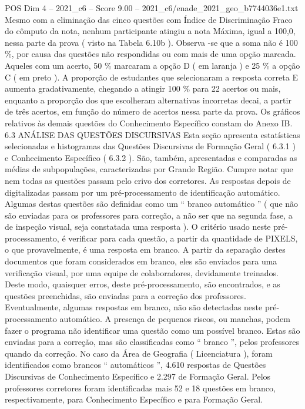 \begin{textsample}{POS Dim 4 – 2021\_c6 – Score 9.00 – 2021\_c6/enade\_2021\_geo\_b7744036e1.txt}
Mesmo com a eliminação das cinco questões com Índice de Discriminação Fraco do cômputo da nota, nenhum participante atingiu a nota Máxima, igual a 100,0, nessa parte da prova ( visto na Tabela 6.10b ).
Observa -se que a soma não é 100 \%, por causa das questões não respondidas ou com mais de uma opção marcada.
Aqueles com um acerto, 50 \% marcaram a opção D ( em laranja ) e 25 \% a opção C ( em preto ).
A proporção de estudantes que selecionaram a resposta correta E aumenta gradativamente, chegando a atingir 100 \% para 22 acertos ou mais, enquanto a proporção dos que escolheram alternativas incorretas decai, a partir de três acertos, em função do número de acertos nessa parte da prova.
Os gráficos relativos às demais questões do Conhecimento Específico constam do Anexo IB. 6.3 ANÁLISE DAS QUESTÕES DISCURSIVAS Esta seção apresenta estatísticas selecionadas e histogramas das Questões Discursivas de Formação Geral ( 6.3.1 ) e Conhecimento Específico ( 6.3.2 ).
São, também, apresentadas e comparadas as médias de subpopulações, caracterizadas por Grande Região.
Cumpre notar que nem todas as questões passam pelo crivo dos corretores.
As respostas depois de digitalizadas passam por um pré-processamento de identificação automático.
Algumas destas questões são definidas como um “ branco automático ” ( que não são enviadas para os professores para correção, a não ser que na segunda fase, a de inspeção visual, seja constatada uma resposta ).
O critério usado neste pré-processamento, é verificar para cada questão, a partir da quantidade de PIXELS, o que provavelmente, é uma resposta em branco.
A partir da separação destes documentos que foram considerados em branco, eles são enviados para uma verificação visual, por uma equipe de colaboradores, devidamente treinados.
Deste modo, quaisquer erros, deste pré-processamento, são encontrados, e as questões preenchidas, são enviadas para a correção dos professores.
Eventualmente, algumas respostas em branco, não são detectadas neste pré-processamento automático.
A presença de pequenos riscos, ou manchas, podem fazer o programa não identificar uma questão como um possível branco.
Estas são enviadas para a correção, mas são classificadas como “ branco ”, pelos professores quando da correção.
No caso da Área de Geografia ( Licenciatura ), foram identificados como brancos “ automáticos ”, 4.610 respostas de Questões Discursivas de Conhecimento Específico e 2.297 de Formação Geral.
Pelos professores corretores foram identificadas mais 52 e 18 questões em branco, respectivamente, para Conhecimento Específico e para Formação Geral.

\end{textsample}
